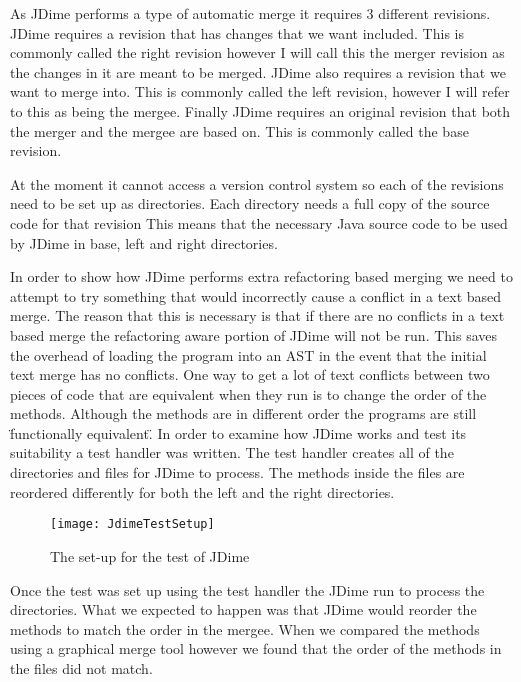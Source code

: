 As JDime performs a type of automatic merge it requires 3 different revisions.
JDime requires a revision that has changes that we want included.  This is commonly called the right revision however I will call this the merger revision as the changes in it are meant to be merged.
JDime also requires a revision that we want to merge into.  This is commonly called the left revision, however I will refer to this as being the mergee. 
Finally JDime requires an original revision that both the merger and the mergee are based on.
This is commonly called the base revision.

At the moment it cannot access a version control system so each of the revisions need to be set up as directories.
Each directory needs a full copy of the source code for that revision 
This means that the necessary Java source code to be used by JDime in base, left and right directories.


In order to show how JDime performs extra refactoring based merging we need to attempt to try something that would incorrectly cause a conflict in a text based merge.  The reason that this is necessary is that if there are no conflicts in a text based merge the refactoring aware portion of JDime will not be run.  This saves the overhead of loading the program into an AST in the event that the initial text merge has no conflicts. 
One way to get a lot of text conflicts between two pieces of code that are equivalent when they run is to change the order of the methods.
Although the methods are in different order the programs are still \"functionally equivalent\".
In order to examine how JDime works and test its suitability a test handler was written.
The test handler creates all of the directories and files for JDime to process.
The methods inside the files are reordered differently for both the left and the right directories.

\begin{figure}[h]
\begin{center}
\texttt{[image: JdimeTestSetup]}
\end{center}
 \caption{The set-up for the test of JDime}
\end{figure}

Once the test was set up using the test handler the JDime run to process the directories.
What we expected to happen was that JDime would reorder the methods to match the order in the mergee. When we compared the methods using a graphical merge tool however we found that the order of the methods in the files did not match.

